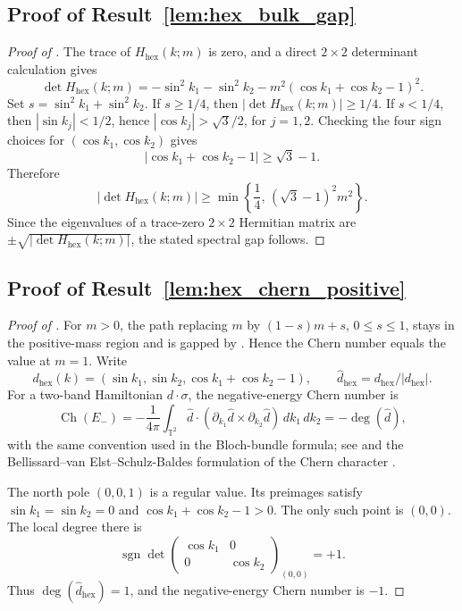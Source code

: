 \documentclass[11pt]{article}
\numberwithin{equation}{section}
\theoremstyle{definition}
\theoremstyle{remark}
\newcommand{\Ch}{\operatorname{Ch}}
\newcommand{\hexagon}{\mathrm{hex}}
\begin{document}
\subsection{Proof of Result~\ref{lem:hex_bulk_gap}}\label{app:proof:lem:hex_bulk_gap}
\begin{proof}[Proof of ]
The trace of \(H_{\hexagon}(k;m)\) is zero, and a direct \(2\times2\) determinant calculation gives
\[
\det H_{\hexagon}(k;m)
=-\sin^2 k_1-\sin^2 k_2-m^2(\cos k_1+\cos k_2-1)^2 .
\]
Set \(s=\sin^2 k_1+\sin^2 k_2\). If \(s\ge1/4\), then
\(|\det H_{\hexagon}(k;m)|\ge1/4\). If \(s<1/4\), then
\(|\sin k_j|<1/2\), hence \(|\cos k_j|>\sqrt3/2\), for \(j=1,2\). Checking the four sign choices
for \((\cos k_1,\cos k_2)\) gives
\[
|\cos k_1+\cos k_2-1|\ge\sqrt{3}-1 .
\]
Therefore
\[
|\det H_{\hexagon}(k;m)|
\ge
\min\left\{\frac14,\,(\sqrt{3}-1)^2m^2\right\}.
\]
Since the eigenvalues of a trace-zero \(2\times2\) Hermitian matrix are
\(\pm\sqrt{|\det H_{\hexagon}(k;m)|}\), the stated spectral gap follows.
\end{proof}

\subsection{Proof of Result~\ref{lem:hex_chern_positive}}\label{app:proof:lem:hex_chern_positive}
\begin{proof}[Proof of ]
For \(m>0\), the path replacing \(m\) by \((1-s)m+s\), \(0\le s\le1\), stays in the positive-mass
region and is gapped by . Hence the Chern number equals the value at
\(m=1\). Write
\[
d_{\hexagon}(k)=(\sin k_1,\sin k_2,\cos k_1+\cos k_2-1),\qquad
\widehat d_{\hexagon}=d_{\hexagon}/|d_{\hexagon}|.
\]
For a two-band Hamiltonian \(d\cdot\sigma\), the negative-energy Chern number is
\[
\Ch(E_-)=
-\frac1{4\pi}\int_{\mathbb T^2}
\widehat d\cdot(\partial_{k_1}\widehat d\times\partial_{k_2}\widehat d)\,dk_1\,dk_2
=-\deg(\widehat d),
\]
with the same convention used in the Bloch-bundle formula; see
\cite[Chapters~4--5]{AsbothOroszlanyPalyi2016} and the Bellissard--van Elst--Schulz-Baldes
formulation of the Chern character \cite{BellissardVanElstSchulzBaldes1994}.

The north pole \((0,0,1)\) is a regular value. Its preimages satisfy
\(\sin k_1=\sin k_2=0\) and \(\cos k_1+\cos k_2-1>0\). The only such point is \((0,0)\). The local
degree there is
\[
\operatorname{sgn}\det
\begin{pmatrix}
\cos k_1&0\\
0&\cos k_2
\end{pmatrix}_{(0,0)}
=+1 .
\]
Thus \(\deg(\widehat d_{\hexagon})=1\), and the negative-energy Chern number is \(-1\).
\end{proof}
\end{document}

